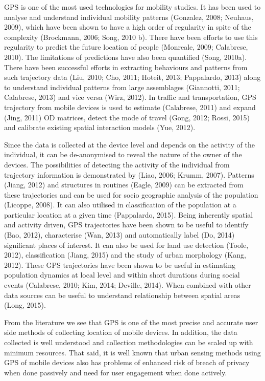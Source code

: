GPS is one of the most used technologies for mobility studies. It has been used
to analyse and understand individual mobility patterns (Gonzalez, 2008; Neuhaus,
2009), which have been shown to have a high order of regularity in spite of the
complexity (Brockmann, 2006; Song, 2010 b). There have been efforts to use this
regularity to predict the future location of people (Monreale, 2009; Calabrese,
2010). The limitations of predictions have also been quantified (Song, 2010a).
There have been successful efforts in extracting behaviours and patterns from
such trajectory data (Liu, 2010; Cho, 2011; Hoteit, 2013; Pappalardo, 2013)
along to understand individual patterns from large assemblages (Giannotti, 2011;
Calabrese, 2013) and vice versa (Wirz, 2012). In traffic and transportation, GPS
trajectory from mobile devices is used to estimate (Calabrese, 2011) and expand
(Jing, 2011) OD matrices, detect the mode of travel (Gong, 2012; Rossi, 2015)
and calibrate existing spatial interaction models (Yue, 2012). 


Since the data is collected at the device level and depends on the activity of
the individual, it can be de-anonymised to reveal the nature of the owner of the
devices. The possibilities of detecting the activity of the individual from
trajectory information is demonstrated by (Liao, 2006; Krumm, 2007). Patterns
(Jiang, 2012) and structures in routines (Eagle, 2009) can be extracted from
these trajectories and can be used for socio geographic analysis of the
population (Licoppe, 2008). It can also utilised in classification of the
population at a particular location at a given time (Pappalardo, 2015). Being
inherently spatial and activity driven, GPS trajectories have been shown to be
useful to identify (Bao, 2012), characterise (Wan, 2013) and automatically label
(Do, 2014) significant places of interest. It can also be used for land use
detection (Toole, 2012), classification (Jiang, 2015) and the study of urban
morphology (Kang, 2012). These GPS trajectories have been shown to be useful in
estimating population dynamics at local level and within short durations during
social events (Calabrese, 2010; Kim, 2014; Deville, 2014). When combined with
other data sources can be useful to understand relationship between spatial
areas (Long, 2015).


From the literature we see that GPS is one of the most precise and accurate
user side methods of collecting location of mobile devices. In addition, the
data collected is well understood and collection methodologies can be scaled up
with minimum resources. That said, it is well known that urban sensing methods
using GPS of mobile devices also has problems of enhanced risk of breach of
privacy when done passively and need for user engagement when done actively.


